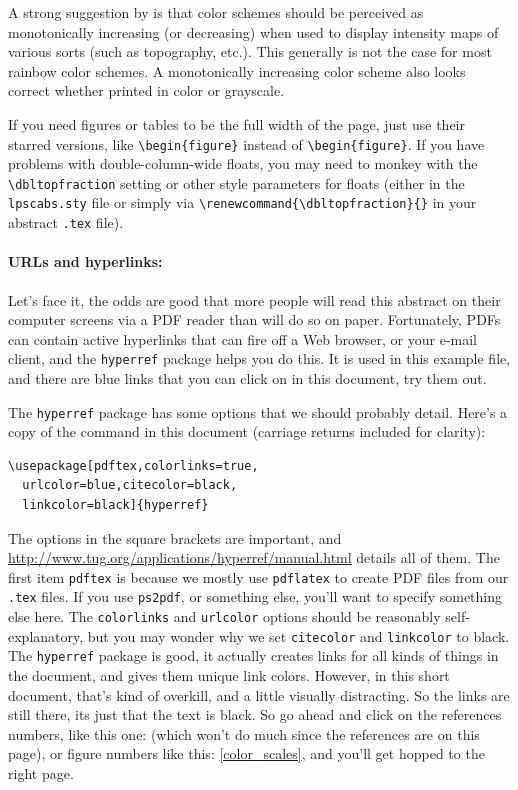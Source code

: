 \documentclass[twoside]{article}
\begin{document}
A strong suggestion by \citep{green2011colour} is that color schemes
should be perceived as monotonically increasing (or decreasing)
when used to display intensity maps of various sorts (such as
topography, etc.). This generally is not the case for most rainbow
color schemes. A monotonically increasing color scheme also looks
correct whether printed in color or grayscale.

If you need figures or tables to be the full width of the page,
just use their starred versions, like \verb=\begin{figure}= instead
of \verb=\begin{figure}=.  If you have problems with double-column-wide
floats, you may need to monkey with the \verb=\dbltopfraction=
setting or other style parameters for floats (either in the
\texttt{lpscabs.sty} file or simply via
\verb=\renewcommand{\dbltopfraction}{}= in your abstract \texttt{.tex}
file).

\paragraph{URLs and hyperlinks:}

Let's face it, the odds are good that more people will read this
abstract on their computer screens via a PDF reader than will do
so on paper.  Fortunately, PDFs can contain active hyperlinks that
can fire off a Web browser, or your e-mail client, and the
\verb=hyperref= package helps you do this.  It is used in this
example file, and there are blue links that you can click on in
this document, try them out.

The \verb=hyperref= package has some options that we should probably 
detail.  Here's a copy of the command in this document (carriage returns 
included for clarity):
\begin{verbatim}
\usepackage[pdftex,colorlinks=true,
  urlcolor=blue,citecolor=black,
  linkcolor=black]{hyperref}
\end{verbatim}
\noindent
The options in the square brackets are important, and
\url{http://www.tug.org/applications/hyperref/manual.html} details
all of them.  The first item \verb=pdftex= is because we mostly use
\verb=pdflatex= to create PDF files from our \verb=.tex= files.  If
you use \verb=ps2pdf=, or something else, you'll want to specify
something else here.  The \verb=colorlinks= and \verb=urlcolor=
options should be reasonably self-explanatory, but you may wonder
why we set \verb=citecolor= and \verb=linkcolor= to black.  The
\verb=hyperref= package is good, it actually creates links for all
kinds of things in the document, and gives them unique link colors.
However, in this short document, that's kind of overkill, and a
little visually distracting.  So the links are still there, its
just that the text is black.  So go ahead and click on the references
numbers, like this one: \citep{latexguide} (which won't do much since
the references are on this page), or figure numbers like
this: \ref{color_scales}, and you'll get hopped to the right page.
\end{document}
